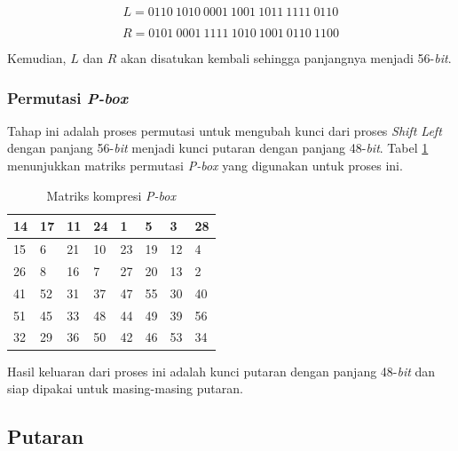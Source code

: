 \begin{equation}
	L = 0110\: 1010\: 0001\: 1001\: 1011\: 1111\: 0110
	\label{eq:L2}
\end{equation}

\begin{equation}
	R = 0101\: 0001\: 1111\: 1010\: 1001\: 0110\: 1100
	\label{eq:R2}
\end{equation}

Kemudian, \begin{math}L\end{math} dan \begin{math}R\end{math} akan disatukan kembali sehingga panjangnya menjadi 56-\textit{bit}.

\subsubsection{Permutasi \textit{P-box}}

Tahap ini adalah proses permutasi untuk mengubah kunci dari proses \textit{Shift Left} dengan panjang 56-\textit{bit} menjadi kunci putaran dengan panjang 48-\textit{bit}. Tabel \ref{table:kompresi_p} menunjukkan matriks permutasi\textit{ P-box} yang digunakan untuk proses ini.

\begin{table}[H]
	\begin{center}
		\caption{Matriks kompresi \textit{P-box}}\label{table:kompresi_p}
		\begin{tabular}{|l|l|l|l|l|l|l|l|}
				\hline
				14	&	17	&	11	&	24	&	1	&	5	&	3	&	28	\\ \hline
				15	&	6	&	21	&	10	&	23	&	19	&	12	&	4	\\ \hline
				26	&	8	&	16	&	7	&	27	&	20	&	13	&	2	\\ \hline
				41	&	52	&	31	&	37	&	47	&	55	&	30	&	40	\\ \hline
				51	&	45	&	33	&	48	&	44	&	49	&	39	&	56	\\ \hline
				32	&	29	&	36	&	50	&	42	&	46	&	53	&	34	\\ \hline
		\end{tabular}
	\end{center}
\end{table}

Hasil keluaran dari proses ini adalah kunci putaran dengan panjang 48-\textit{bit} dan siap dipakai untuk masing-masing putaran.

\subsection{Putaran}

